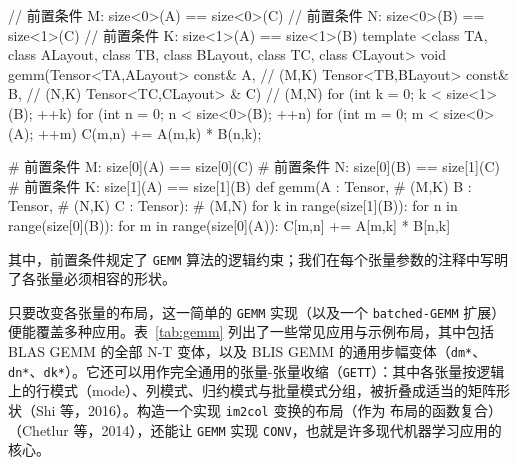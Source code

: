 \noindent
\begin{minipage}[t]{0.54\textwidth}
\begin{cpp}
// 前置条件 M: size<0>(A) == size<0>(C)
// 前置条件 N: size<0>(B) == size<1>(C)
// 前置条件 K: size<1>(A) == size<1>(B)
template <class TA, class ALayout,
          class TB, class BLayout,
          class TC, class CLayout>
void
gemm(Tensor<TA,ALayout> const& A,  // (M,K)
     Tensor<TB,BLayout> const& B,  // (N,K)
     Tensor<TC,CLayout>      & C)  // (M,N)
{
  for (int k = 0; k < size<1>(B); ++k) {
    for (int n = 0; n < size<0>(B); ++n) {
      for (int m = 0; m < size<0>(A); ++m) {
        C(m,n) += A(m,k) * B(n,k);
  } } }
}
\end{cpp}
\end{minipage}
\hfill
\begin{minipage}[t]{0.43\textwidth}
\begin{python}
# 前置条件 M: size[0](A) == size[0](C)
# 前置条件 N: size[0](B) == size[1](C)
# 前置条件 K: size[1](A) == size[1](B)
def gemm(A : Tensor,   # (M,K)
         B : Tensor,   # (N,K)
         C : Tensor):  # (M,N)
  for k in range(size[1](B)):
    for n in range(size[0](B)):
      for m in range(size[0](A)):
        C[m,n] += A[m,k] * B[n,k]
\end{python}
\end{minipage}
其中，前置条件规定了 {\tt GEMM} 算法的逻辑约束；我们在每个张量参数的注释中写明了各张量必须相容的形状。

只要改变各张量的布局，这一简单的 \texttt{GEMM} 实现（以及一个 \texttt{batched-GEMM} 扩展）便能覆盖多种应用。表~\ref{tab:gemm} 列出了一些常见应用与示例布局，其中包括 BLAS GEMM 的全部 N-T 变体，以及 BLIS GEMM 的通用步幅变体（\texttt{dm*}、\texttt{dn*}、\texttt{dk*}）。它还可以用作完全通用的张量-张量收缩（{\tt GETT}）：其中各张量按逻辑上的行模式（mode）、列模式、归约模式与批量模式分组，被折叠成适当的矩阵形状（Shi 等，2016）。构造一个实现 {\tt im2col} 变换的布局（作为 \CuTe 布局的函数复合）（Chetlur 等，2014），还能让 \texttt{GEMM} 实现 {\tt CONV}，也就是许多现代机器学习应用的核心。


